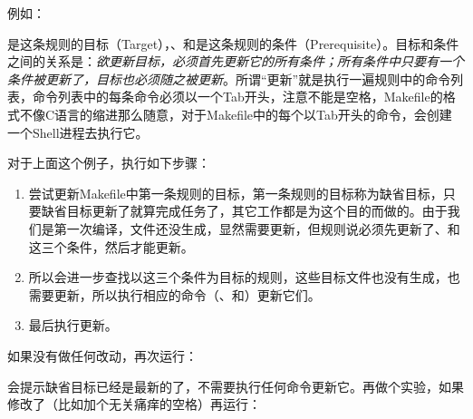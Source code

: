 

例如：




是这条规则的目标（Target），、和是这条规则的条件（Prerequisite）。目标和条件之间的关系是：\emph{欲更新目标，必须首先更新它的所有条件；所有条件中只要有一个条件被更新了，目标也必须随之被更新}。所谓“更新”就是执行一遍规则中的命令列表，命令列表中的每条命令必须以一个Tab开头，注意不能是空格，Makefile的格式不像C语言的缩进那么随意，对于Makefile中的每个以Tab开头的命令，会创建一个Shell进程去执行它。



对于上面这个例子，执行如下步骤：


\begin{enumerate}

\item 尝试更新Makefile中第一条规则的目标，第一条规则的目标称为缺省目标，只要缺省目标更新了就算完成任务了，其它工作都是为这个目的而做的。由于我们是第一次编译，文件还没生成，显然需要更新，但规则说必须先更新了、和这三个条件，然后才能更新。

\item 所以会进一步查找以这三个条件为目标的规则，这些目标文件也没有生成，也需要更新，所以执行相应的命令（、和）更新它们。

\item 最后执行更新。
\end{enumerate}


如果没有做任何改动，再次运行：




会提示缺省目标已经是最新的了，不需要执行任何命令更新它。再做个实验，如果修改了（比如加个无关痛痒的空格）再运行：




